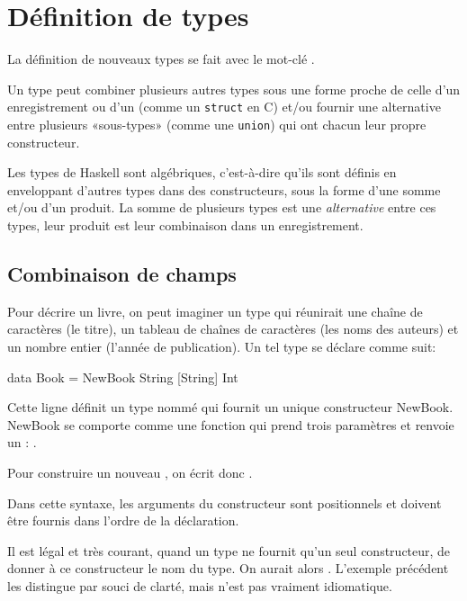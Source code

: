\section{Définition de types}
\label{defining-types}
\label{kw:data}

La définition de nouveaux types se fait avec le mot-clé .

Un type peut combiner plusieurs autres types sous une forme proche de celle d'un enregistrement ou d'un  (comme un \texttt{struct} en C) et/ou fournir une alternative entre plusieurs «sous-types» (comme une \texttt{union}) qui ont chacun leur propre constructeur.

\begin{mathbox}
Les types de Haskell sont algébriques, c'est-à-dire qu'ils sont définis en enveloppant d'autres types dans des constructeurs, sous la forme d'une somme et/ou d'un produit. La somme de plusieurs types est une \emph{alternative} entre ces types, leur produit est leur combinaison dans un enregistrement.
\end{mathbox}

\subsection{Combinaison de champs}

 Pour décrire un livre, on peut imaginer un type qui réunirait une chaîne de caractères (le titre), un tableau de chaînes de caractères (les noms des auteurs) et un nombre entier (l'année de publication). Un tel type se déclare comme suit:

\begin{haskellcode}
data Book = NewBook String [String] Int
\end{haskellcode}

Cette ligne définit un type nommé  qui fournit un unique constructeur NewBook. NewBook se comporte comme une fonction qui prend trois paramètres et renvoie un : .

Pour construire un nouveau , on écrit donc .

Dans cette syntaxe, les arguments du constructeur sont positionnels et doivent être fournis dans l'ordre de la déclaration.

\begin{infobox}
Il est légal et très courant, quand un type ne fournit qu'un seul constructeur, de donner à ce constructeur le nom du type. On aurait alors . L'exemple précédent les distingue par souci de clarté, mais n'est pas vraiment idiomatique.
\end{infobox}

